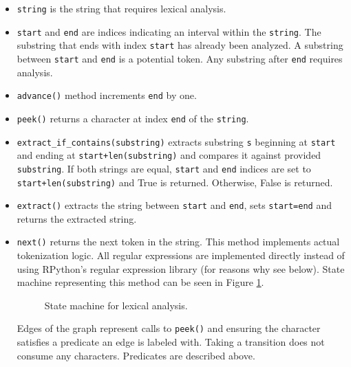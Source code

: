 \begin{itemize}
\item
\texttt{string} is the string that requires lexical analysis.

\item
\texttt{start} and \texttt{end} are indices indicating an interval within the \texttt{string}. The substring that ends with index \texttt{start} has already been analyzed. A substring between \texttt{start} and \texttt{end} is a potential token. Any substring after \texttt{end} requires analysis.

\item
\texttt{advance()} method increments \texttt{end} by one.

\item
\texttt{peek()} returns a character at index \texttt{end} of the \texttt{string}.

\item
\texttt{extract\_if\_contains(substring)} extracts substring \texttt{s} beginning at \texttt{start} and ending at \texttt{start+len(substring)} and compares it against provided \texttt{substring}. If both strings are equal, \texttt{start} and \texttt{end} indices are set to \texttt{start+len(substring)} and True is returned. Otherwise, False is returned.

\item
\texttt{extract()} extracts the string between \texttt{start} and \texttt{end}, sets \texttt{start=end} and returns the extracted string.

\item
	\texttt{next()} returns the next token in the string. This method implements actual tokenization logic. All regular expressions are implemented directly instead of using RPython's regular expression library (for reasons why see below). State machine representing this method can be seen in Figure \ref{lexical-analysis-tokenize}.

\begin{figure}[th!]
	\centering
\caption{State machine for lexical analysis.}
\label{lexical-analysis-tokenize}
\end{figure}

Edges of the graph represent calls to \texttt{peek()} and ensuring the character satisfies a predicate an edge is labeled with. Taking a transition does not consume any characters. Predicates are described above.


\end{itemize}
